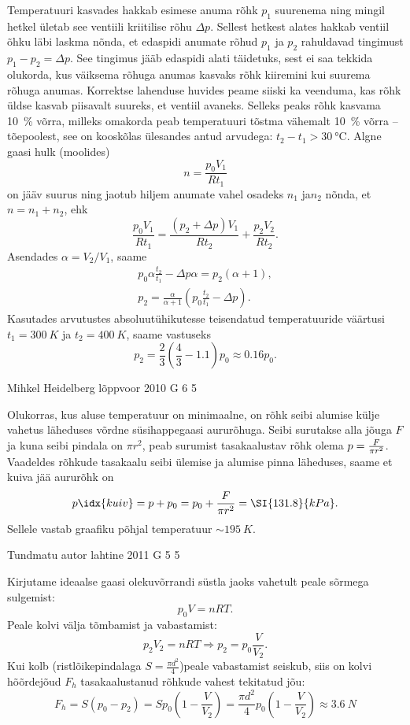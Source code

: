 \documentclass[11pt, twoside]{article}
\begin{document}
{{\ifSolution
Temperatuuri kasvades hakkab esimese anuma rõhk $p_1$ suurenema ning mingil hetkel ületab see ventiili kriitilise rõhu $\Delta p$. Sellest hetkest alates hakkab ventiil õhku läbi laskma nõnda, et edaspidi anumate rõhud $p_1$ ja $p_2$ rahuldavad tingimust $p_1 - p_2 = \Delta p$. See tingimus jääb edaspidi alati täidetuks, sest ei saa tekkida olukorda, kus väiksema rõhuga anumas kasvaks rõhk kiiremini kui suurema rõhuga anumas. Korrektse lahenduse huvides peame siiski ka veenduma, kas rõhk üldse kasvab piisavalt suureks, et ventiil avaneks. Selleks peaks rõhk kasvama \SI{10}{\%} võrra, milleks omakorda peab temperatuuri tõstma vähemalt \SI{10}{\%} võrra – tõepoolest, see on kooskõlas ülesandes antud arvudega: $t_2 - t_1 > \SI{30}{\celsius}$. Algne gaasi hulk (moolides)
\[
n=\frac{p_{0} V_{1}}{R t_{1}}
\]
on jääv suurus ning jaotub hiljem anumate vahel osadeks $n_1$ ja$n_2$ nõnda, et $n = n_1+ n_2$, ehk
\[
\frac{p_{0} V_{1}}{R t_{1}}=\frac{\left(p_{2}+\Delta p\right) V_{1}}{R t_{2}}+\frac{p_{2} V_{2}}{R t_{2}}.
\]
Asendades $\alpha = V_2/V_1$, saame
\[
\begin{array}{l}{p_{0} \alpha \frac{t_{2}}{t_{1}}-\Delta p \alpha=p_{2}(\alpha+1),} \\ {p_{2}=\frac{\alpha}{\alpha+1}\left(p_{0} \frac{t_{2}}{t_{1}}-\Delta p\right).}\end{array}
\]
Kasutades arvutustes absoluutühikutesse teisendatud temperatuuride väärtusi $t_1= \SI{300}{K}$ ja $t_2= \SI{400}{K}$, saame vastuseks
\[
p_2=\frac 23 \left(\frac 43- \num{1,1}\right) p_0 \approx \num{0,16}p_0.
\]
\fi
}

{Mihkel Heidelberg} %
{lõppvoor} %
{2010} %
{G 6} %
{5} %
{

\ifSolution
Olukorras, kus aluse temperatuur on minimaalne, on rõhk seibi alumise külje vahetus läheduses võrdne
süsihappegaasi aururõhuga. Seibi surutakse alla jõuga $F$ ja kuna seibi
pindala on $\pi r^2$, peab surumist tasakaalustav rõhk olema $p={F\over \pi r^2}$.
Vaadeldes rõhkude tasakaalu seibi ülemise ja alumise pinna läheduses, saame et kuiva jää aururõhk on
\[
p\idx{kuiv} = p + p_0= p_0+{F\over \pi r^2} = \SI{131.8}{kPa}.
\]
Sellele vastab graafiku põhjal temperatuur $\sim \SI{195}{K}$.
\fi
}

{Tundmatu autor} %
{lahtine} %
{2011} %
{G 5} %
{5} %
{

\ifSolution
Kirjutame ideaalse gaasi olekuvõrrandi süstla jaoks vahetult peale sõrmega sulgemist:
\[p_{0}V=nRT.\]
Peale kolvi välja tõmbamist ja vabastamist:
\[p_{2}V_{2}=nRT \Rightarrow p_{2}=p_{0}\frac{V}{V_{2}}. \]
Kui kolb (ristlõikepindalaga $S=\frac{\pi d^{2}}{4}$)peale vabastamist seiskub, siis on kolvi hõõrdejõud $F_{h}$ tasakaalustanud rõhkude vahest tekitatud jõu:
\[F_{h}=S(p_{0}-p_{2})=Sp_{0} \left(1-\frac{V}{V_{2}}\right)=\frac{\pi
	d^{2}}{4}p_{0} \left(1-\frac{V}{V_{2}}\right) \approx \SI{3,6}{N} \]
\fi
}

}
\end{document}
